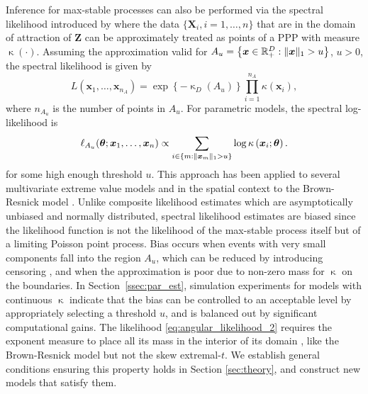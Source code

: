 \documentclass[12pt]{article}
\begin{document}
Inference for max-stable processes can also be performed via the spectral likelihood introduced by \citet{Coles.Tawn:1991} where the data $\{\bm X_i,i=1,\dots,n\}$ that are in the domain of attraction of $\bm Z$ can be approximately treated as points of a PPP with measure $\upkappa(\cdot)$. Assuming the approximation valid for $A_{u} = \left\{ {\boldsymbol{x}} \in {\mathbb R}^D_+: \| {\boldsymbol{x}} \|_1 > u\right\}$, $u>0$, the spectral likelihood is given by
%
\begin{equation}
\label{eq:angular_likelihood_1}
L(\bm x_1,\dots,\bm x_{n_{A}}) 
= \exp\left\{-\upkappa_D(A_{u})\right\} \prod_{i=1}^{n_{A}}\kappa(\bm x_i), 
\end{equation}
%
where $n_{A_u}$ is the number of points in $A_{u}$. 
For parametric models,
the spectral log-likelihood is 
%
\begin{equation}
\label{eq:angular_likelihood_2}
\ell_{A_u}(\bm \theta;{\boldsymbol{x}}_1,\dots,{\boldsymbol{x}}_n) \propto 
\sum_{i \in \{m: \|{\boldsymbol{x}}_m\|_1 > u\}} 
\log \kappa\left( \bm x_i;\bm \theta\right). 
\end{equation} 
%
for some high enough threshold $u$. This approach has been applied to several multivariate extreme value models \citep[see, e.g.,][]{Cooley.etal:2010,Engelke.etal:2015, Beranger.Padoan:2015, Sabourin.etal2013} and in the spatial context to the Brown-Resnick model \citep{Engelke.etal:2015}.
%
Unlike composite likelihood estimates which are asymptotically unbiased and normally distributed, spectral likelihood estimates are biased since the likelihood function is not the likelihood of the max-stable process itself but of a limiting Poisson point process. 
Bias occurs when events with very small components fall into the region $A_{u}$, which can be reduced by introducing censoring \citep[see][]{Wadsworth.Tawn:2014, Thibaud.Opitz:2015}, and when the approximation is poor due to non-zero mass for $\upkappa$ on the boundaries. In Section~\ref{ssec:par_est}, simulation experiments for models with continuous $\upkappa$ indicate that the bias can be controlled to an acceptable level by appropriately selecting a threshold $u$, and is balanced out by significant computational gains. 
The likelihood \eqref{eq:angular_likelihood_2} requires the exponent measure to place all its mass in the interior of its domain \citep{Thibaud.Opitz:2015}, like the Brown-Resnick model but not the skew extremal-$t$.
We establish general conditions ensuring this property holds in Section \ref{sec:theory}, and construct new models that satisfy them. 
\end{document}
